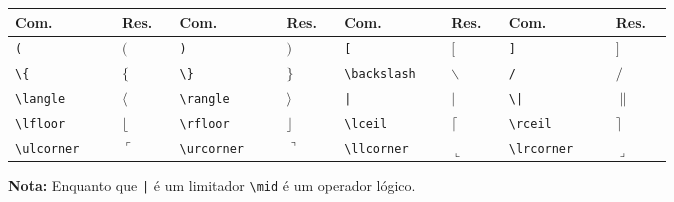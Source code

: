 % 
% 
% 
% 
% 
\begin{tabular}{>{\centering}p{0.13\linewidth}<{\centering}>{\centering}p{0.07\linewidth}<{\centering}|>{\centering}p{0.13\linewidth}<{\centering}>{\centering}p{0.07\linewidth}<{\centering}|>{\centering}p{0.13\linewidth}<{\centering}>{\centering}p{0.07\linewidth}<{\centering}|>{\centering}p{0.13\linewidth}<{\centering}>{\centering}p{0.07\linewidth}<{\centering}}
    \hline
    Com. & Res. & Com. & Res. & Com. & Res. & Com. & Res. \tabularnewline \hline
    \lstinline!(! & $($ & \lstinline!)! & $)$ & \lstinline![! & $[$ & \lstinline!]! & $]$ \tabularnewline
    \lstinline!\{! & $\{$ & \lstinline!\}! & $\}$ & \lstinline!\backslash! & $\backslash$ & \lstinline!/! & $/$ \tabularnewline
    \lstinline!\langle! & $\langle$ & \lstinline!\rangle! & $\rangle$ & \lstinline!|! & $|$ & \lstinline!\|! & $\|$ \tabularnewline
    \lstinline!\lfloor! & $\lfloor$ & \lstinline!\rfloor! & $\rfloor$ & \lstinline!\lceil! & $\lceil$ & \lstinline!\rceil! & $\rceil$ \tabularnewline
    \lstinline!\ulcorner! & $\ulcorner$ & \lstinline!\urcorner! & $\urcorner$ &\lstinline!\llcorner! & $\llcorner$ & \lstinline!\lrcorner! & $\lrcorner$ \tabularnewline \hline
\end{tabular}
\begin{flushleft}
    \textbf{Nota:} Enquanto que \lstinline!|! \'{e} um limitador \lstinline!\mid! \'{e} um operador l\'{o}gico.
\end{flushleft}
